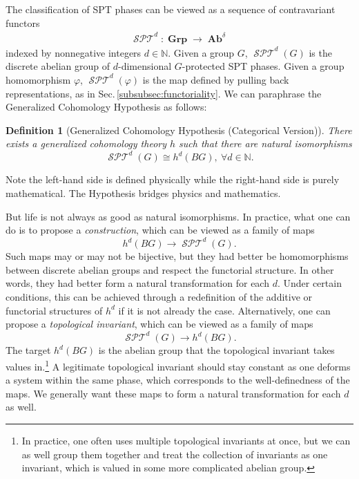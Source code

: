 \documentclass[sort&compress]{elsarticle}
\theoremstyle{theoremstyle}
\theoremstyle{framedtheoremstyle}
\theoremstyle{definitionstyle}
\theoremstyle{definitionstyle}
\theoremstyle{definitionstyle}
\theoremstyle{definitionstyle}
\theoremstyle{nameddefinitionstyle}
\newtheorem{nameddef}{Definition}
\theoremstyle{framednameddefinitionstyle}
\theoremstyle{proofstyle}
\theoremstyle{definitionstyle}
\newcommand{\fromto}{\rightarrow}
\newcommand{\NNN}{\mathbb{N}}
\newcommand{\Grp}{\operatorname{\mathbf{Grp}}}
\newcommand{\Ab}{\operatorname{\mathbf{Ab}}}
\newcommand{\isomorphic}{\cong}
\newcommand{\paren}[1]{\left( #1 \right)}
\newcommand{\SPT}{\operatorname{\mathcal{SPT}}}
\begin{document}
\begin{appendices}
The classification of SPT phases can be viewed as a sequence of contravariant functors
\begin{eqnarray}
\SPT^d: \Grp \fromto \Ab^\delta
\end{eqnarray}
indexed by nonnegative integers $d\in \NNN$. Given a group $G$, $\SPT^d\paren{G}$ is the discrete abelian group of $d$-dimensional $G$-protected SPT phases. Given a group homomorphism $\varphi$, $\SPT^d(\varphi)$ is the map defined by pulling back representations, as in Sec.\,\ref{subsubsec:functoriality}.
We can paraphrase the Generalized Cohomology Hypothesis as follows:

\begin{nameddef}[Generalized Cohomology Hypothesis (Categorical Version)]
There exists a generalized cohomology theory $h$ such that there are natural isomorphisms
\begin{equation}
\SPT^d(G) \isomorphic h^d(BG), ~ \forall d\in \NNN.
\end{equation}
\end{nameddef}

Note the left-hand side is defined physically while the right-hand side is purely mathematical. The Hypothesis bridges physics and mathematics.

But life is not always as good as natural isomorphisms. In practice, what one can do is to propose a \emph{construction}, which can be viewed as a family of maps
\begin{equation}
h^d\paren{BG} \fromto \SPT^d\paren{G}.
\end{equation}
Such maps may or may not be bijective, but they had better be homomorphisms between discrete abelian groups and respect the functorial structure. In other words, they had better form a natural transformation for each $d$. Under certain conditions, this can be achieved through a redefinition of the additive or functorial structures of $h^d$ if it is not already the case. Alternatively, one can propose a \emph{topological invariant}, which can be viewed as a family of maps
\begin{equation}
\SPT^d\paren{G} \fromto h^d\paren{BG}.
\end{equation}
The target $h^d\paren{BG}$ is the abelian group that the topological invariant takes values in.\footnote{In practice, one often uses multiple topological invariants at once, but we can as well group them together and treat the collection of invariants as one invariant, which is valued in some more complicated abelian group.} A legitimate topological invariant should stay constant as one deforms a system within the same phase, which corresponds to the well-definedness of the maps. We generally want these maps to form a natural transformation for each $d$ as well.






\end{appendices}
\end{document}
